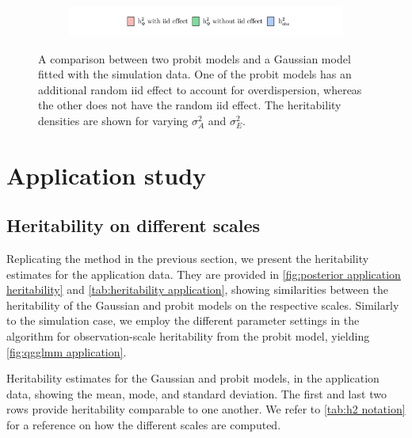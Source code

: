 \begin{figure}[H]
\begin{subfigure}{0.49\textwidth}
    \end{subfigure}
    \begin{subfigure}{\textwidth}
        \includegraphics[width=\textwidth]{figures/overdisperions_legend.pdf}
    \end{subfigure}
    \caption[Posterior with and without overdispersion (simulation data)]{A comparison between two probit models and a Gaussian model fitted with the simulation data. One of the probit models has an additional random iid effect to account for overdispersion, whereas the other does not have the random iid effect. The heritability densities are shown for varying $\sigma^2_A$ and $\sigma^2_E$. %
    }
    \label{fig:overdisperion plots}
\end{figure}


\section{Application study}

\subsection{Heritability on different scales}
Replicating the method in the previous section, we present the heritability estimates for the application data. They are provided in \autoref{fig:posterior application heritability} and \autoref{tab:heritability application}, showing similarities between the heritability of the Gaussian and probit models on the respective scales. Similarly to the simulation case, we employ the different parameter settings in the algorithm for observation-scale heritability from the probit model, yielding \autoref{fig:qgglmm application}.
 
\begin{table}[ht]\centering

\caption[Heritability means for all scales in application data]{Heritability estimates for the Gaussian and probit models, in the application data, showing the mean, mode, and standard deviation. The first and last two rows provide heritability comparable to one another. We refer to \autoref{tab:h2 notation} for a reference on how the different scales are computed.}
\label{tab:heritability application}
\end{table}

